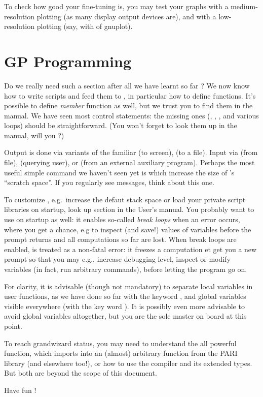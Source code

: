 To check how good your fine-tuning is, you may test your graphs with a
medium-resolution plotting (as many display output devices are), and
with a low-resolution plotting (say, with  of gnuplot).

\section{GP Programming}

Do we really need such a section after all we have learnt so far ? We now
know how to write scripts and feed them to , in particular how to
define functions. It's possible to define \emph{member} function as well, but
we trust you to find them in the manual. We have seen most control
statements: the missing ones (, , ,
 and various  loops) should be straightforward. (You
won't forget to look them up in the manual, will you ?)

Output is done via variants of the familiar  (to screen),
 (to a file). Input via  (from file), 
(querying user), or  (from an external auxiliary program).
Perhaps the most useful simple command we haven't seen yet is
 which increase the size of 's ``scratch space''. If
you regularly see  messages, think about this
one.

To customize , e.g.~increase the defaut stack space or load your
private script libraries on startup, look up 
section in the User's manual. You probably want to use  on startup
as well: it enables so-called \emph{break loops} when an error occurs, where
you get a chance, e.g to inspect (and save!) values of variables before the
prompt returns and all computations so far are lost. When break loops
are enabled,  is treated as a non-fatal error: it freezes a
computation et get you a new prompt so that you may e.g., increase debugging
level, inspect or modify variables (in fact, run arbitrary commands), before
letting the program go on.

For clarity, it is advisable (though not mandatory) to separate local
variables in user functions, as we have done so far with the keyword
, and global variables visible everywhere (with the key word
). It is possibly even more advisable to avoid global variables
altogether, but you are the sole master on board at this point.

To reach grandwizard status, you may need to understand the all powerful
 function, which imports into  an (almost) arbitrary
function from the PARI library (and elsewhere too!), or how to use the
 compiler and its extended types. But both are beyond the scope of
this document.

Have fun !
\vfill\eject\bye
